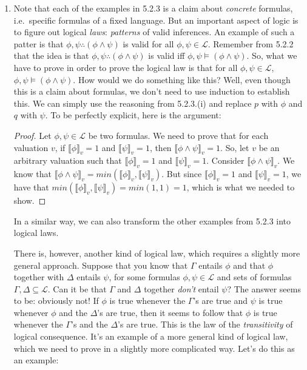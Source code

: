 \begin{enumerate}[\thesection.1]
	  \item Note that each of the examples in 5.2.3 is a claim about \emph{concrete} formulas, i.e.\ specific formulas of a fixed language.
			But an important aspect of logic is to figure out logical \emph{laws}: \emph{patterns} of valid inferences.
			An example of such a patter is that $\phi,\psi\therefore(\phi\land\psi)$ is valid for all $\phi,\psi\in\mathcal{L}$.
			Remember from 5.2.2 that the idea is that $\phi,\psi\therefore(\phi\land\psi)$ is valid iff $\phi,\psi\vDash (\phi\land\psi)$.
			So, what we have to prove in order to prove the logical law is that for all $\phi,\psi\in\mathcal{L}$, $\phi,\psi\vDash(\phi\land\psi)$.
			How would we do something like this?
			Well, even though this is a claim about formulas, we don't need to use induction to establish this.
			We can simply use the reasoning from 5.2.3.(i) and replace $p$ with $\phi$ and $q$ with $\psi$.
			To be perfectly explicit, here is the argument:
			\begin{proof}
			  Let $\phi,\psi\in\mathcal{L}$ be two formulas.
			  We need to prove that for each valuation $v$, if $\llbracket \phi\rrbracket_v=1$ and $\llbracket \psi\rrbracket_v=1$, then $\llbracket \phi\land \psi\rrbracket_v=1$.
			  So, let $v$ be an arbitrary valuation such that $\llbracket \phi\rrbracket_v=1$ and $\llbracket \psi\rrbracket_v=1$.
			  Consider $\llbracket \phi\land \psi\rrbracket_v$.
			  We know that $\llbracket \phi\land \psi\rrbracket_v=min(\llbracket \phi\rrbracket_v, \llbracket \psi\rrbracket_v)$.
			  But since $\llbracket \phi\rrbracket_v=1$ and $\llbracket \psi\rrbracket_v=1$, we have that $min(\llbracket \phi\rrbracket_v, \llbracket \psi\rrbracket_v)=min(1,1)=1$, which is what we needed to show.
			\end{proof}
In a similar way, we can also transform the other examples from 5.2.3 into logical laws. 

There is, however, another kind of logical law, which requires a slightly more general approach. Suppose that you know that $\Gamma$ entails $\phi$ and that $\phi$ together with $\Delta$ entails $\psi$, for some formulas $\phi,\psi\in\mathcal{L}$ and sets of formulas $\Gamma,\Delta\subseteq\mathcal{L}$. Can it be that $\Gamma$ and $\Delta$ together \emph{don't} entail $\psi$? The answer seems to be: obviously not! If $\phi$ is true whenever the $\Gamma$'s are true and $\psi$ is true whenever $\phi$ and the $\Delta$'s are true, then it seems to follow that $\phi$ is true whenever the $\Gamma$'s and the $\Delta$'s are true. This is the law of the \emph{transitivity} of logical consequence. It's an example of a more general kind of logical law, which we need to prove in a slightly more complicated way. Let's do this as an example:
		

\end{enumerate}
